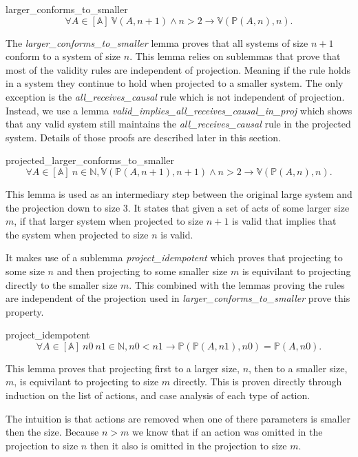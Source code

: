 \documentclass[runningheads]{llncs}
\newcommand{\action}{\mathds{A}}
\newcommand{\listaction}{[\action]}
\newcommand{\actsvalid}[2]{\mathds{V}(#1, #2)}
\newcommand{\projectsize}[2]{\mathds{P}(#1, #2)}
\begin{document}
\begin{lemma}{larger\_conforms\_to\_smaller}
$$\forall A \in \listaction\ \actsvalid{A}{n+1} \wedge n > 2 \longrightarrow \actsvalid{\projectsize{A}{n}}{n}.$$
\end{lemma}

The \emph{larger\_conforms\_to\_smaller} lemma proves that all systems of size $n+1$ conform to a system of size $n$. This lemma relies on sublemmas that prove that most of the validity rules are independent of projection. Meaning if the rule holds in a system they continue to hold when projected to a smaller system. The only exception is the \emph{all\_receives\_causal} rule which is not independent of projection. Instead, we use a lemma \emph{valid\_implies\_all\_receives\_causal\_in\_proj} which shows that any valid system still maintains the \emph{all\_receives\_causal} rule in the projected system. Details of those proofs are described later in this section. 


\begin{lemma}{projected\_larger\_conforms\_to\_smaller}
$$\forall A \in \listaction\ n \in \mathds{N}, \actsvalid{\projectsize{A}{n+1}}{n+1} \wedge n > 2 \longrightarrow \actsvalid{\projectsize{A}{n}}{n}.$$
\end{lemma}
This lemma is used as an intermediary step between the original large system and the projection down to size 3. It states that given a set of acts of some larger size $m$, if that larger system when projected to size $n+1$ is valid that implies that the system when projected to size $n$ is valid.

It makes use of a sublemma \emph{project\_idempotent} which proves that projecting to some size $n$ and then projecting to some smaller size $m$ is equivilant to projecting directly to the smaller size $m$. This combined with the lemmas proving the rules are independent of the projection used in \emph{larger\_conforms\_to\_smaller} prove this property.

\begin{lemma}{project\_idempotent}
$$\forall A \in \listaction\ n0\ n1 \in \mathds{N}, n0 < n1 \longrightarrow \projectsize{\projectsize{A}{n1}}{n0} = \projectsize{A}{n0}.$$
\end{lemma}
This lemma proves that projecting first to a larger size, $n$, then to a smaller size, $m$, is equivilant to projecting to size $m$ directly. This is proven directly through induction on the list of actions, and case analysis of each type of action. 

The intuition is that actions are removed when one of there parameters is smaller then the size. Because $n>m$ we know that if an action was omitted in the projection to size $n$ then it also is omitted in the projection to size $m$.  
\end{document}
